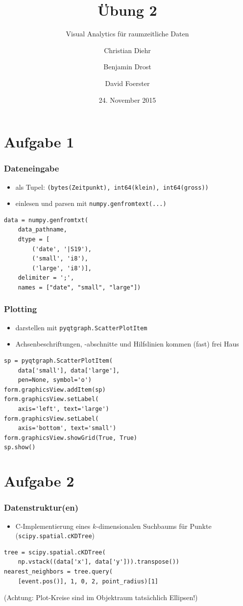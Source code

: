 \documentclass{beamer}
\title{Übung 2}
\subtitle{Visual Analytics für raumzeitliche Daten}
\author{Christian Diehr \and Benjamin Drost \and David Foerster}
\institute{Institut für Informatik\\Humboldt-Universität zu Berlin}
\date{24. November 2015}
\begin{document}
    \begin{frame}
        \titlepage
    \end{frame}
    \logo %

    \section{Aufgabe 1}
    \begin{frame}[containsverbatim]
	    \frametitle{Dateneingabe}
      \begin{itemize}
        \setlength\itemsep{1em}
      	\item als Tupel: \lstinline{(bytes(Zeitpunkt), int64(klein), int64(gross))}
      	\item einlesen und parsen mit \lstinline{numpy.genfromtext(...)}
      \end{itemize}
			\begin{lstlisting}
data = numpy.genfromtxt(
	data_pathname,
	dtype = [
		('date', '|S19'),
		('small', 'i8'),
		('large', 'i8')],
	delimiter = ';',
	names = ["date", "small", "large"])
			\end{lstlisting}
    \end{frame}

    \begin{frame}[containsverbatim]
    \frametitle{Plotting}
    	\begin{itemize}
    		\setlength\itemsep{1em}
    		\item darstellen mit \lstinline{pyqtgraph.ScatterPlotItem}
    		\item Achsenbeschriftungen, -abschnitte und Hilfslinien kommen (fast) frei Haus
    	\end{itemize}
    	\begin{lstlisting}
sp = pyqtgraph.ScatterPlotItem(
	data['small'], data['large'],
	pen=None, symbol='o')
form.graphicsView.addItem(sp)
form.graphicsView.setLabel(
	axis='left', text='large')
form.graphicsView.setLabel(
	axis='bottom', text='small')
form.graphicsView.showGrid(True, True)
sp.show()
			\end{lstlisting}
    \end{frame}

    \section{Aufgabe 2}
    \begin{frame}[containsverbatim]
    	\frametitle{Datenstruktur(en)}
    	\begin{itemize}
    		\setlength\itemsep{1em}
    		\item C-Implementierung eines $k$-dimensionalen Suchbaums für Punkte (\lstinline{scipy.spatial.cKDTree})
    	\end{itemize}
    	\begin{lstlisting}
tree = scipy.spatial.cKDTree(
	np.vstack((data['x'], data['y'])).transpose())
nearest_neighbors = tree.query(
	[event.pos()], 1, 0, 2, point_radius)[1]
    	\end{lstlisting}
    	(Achtung: Plot-Kreise sind im Objektraum tatsächlich Ellipsen!)
    \end{frame}
\end{document}
